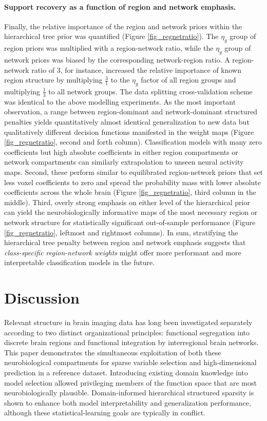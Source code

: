 \documentclass{article} %
\begin{document}
\paragraph{Support recovery as a function of region and network emphasis.}
Finally, the relative importance of the
region and network priors within the hierarchical tree prior
was quantified (Figure \ref{fig_regnetratio}).
The $\eta_g$ group of region priors was multiplied with a
region-network ratio, while the
$\eta_g$ group of network priors was biased by the corresponding
network-region ratio. A region-network ratio of 3, for instance,
increased the relative importance of known region structure
by multiplying $\frac{3}{1}$ to the
$\eta_g$ factor of all region groups
and multiplying
$\frac{1}{3}$ to all network groups.
The data splitting cross-validation scheme was identical to the
above modelling experiments.
%
As the most important observation,
a range between region-dominant and network-dominant structured penalties
yields quantitatively almost identical generalization to new data
but qualitatively different decision functions manifested in the weight maps
(Figure \ref{fig_regnetratio}, second and forth column).
Classification models with many zero coefficients but high absolute
coefficients in either region compartments or network compartments
can similarly extrapolation to unseen neural activity maps.
Second,
these perform similar to equilibrated region-network priors
that set less voxel coefficients to zero and spread the
probability mass with lower absolute coefficients across the whole brain
(Figure \ref{fig_regnetratio}, third column in the middle).
Third,
overly strong emphasis on either level of the hierarchical prior
can yield the neurobiologically informative maps
of the most necessary region or network structure for
statistically significant out-of-sample performance
(Figure \ref{fig_regnetratio}, leftmost and rightmost columns).
%
In sum,
stratifying the hierarchical tree penalty between region and network emphasis
suggests that \textit{class-specific region-network weights}
might offer more performant and more interpretable classification models
in the future.



\section{Discussion}
Relevant structure in brain imaging data has long been investigated
separately
according to two distinct organizational principles:
functional segregation into discrete brain regions
and functional integration by interregional brain networks.
%
This paper demonstrates the simultaneous exploitation of
both these neurobiological compartments
for sparse variable selection and high-dimensional prediction
in a reference dataset.
%
Introducing existing domain knowledge into model selection
allowed privileging members of the function space
that are most neurobiologically plausible.
%
Domain-informed hierarchical structured sparsity is shown to enhance
both model interpretability and generalization performance,
although these statistical-learning goals are typically in conflict.
\end{document}
